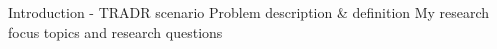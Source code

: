 Introduction - TRADR scenario
Problem description & definition 
My research focus topics and research questions

    